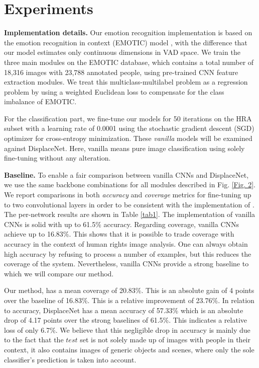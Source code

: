\documentclass[10pt,twocolumn,letterpaper]{article}
\begin{document}
\section{Experiments}

\noindent
\textbf{Implementation details.} Our emotion recognition implementation is based on the emotion recognition in context (EMOTIC) model \cite{kosti2017emotion}, with the difference that our model estimates only continuous dimensions in VAD space. We train the three main modules on the EMOTIC database, which contains a total number of 18,316 images with 23,788 annotated people, using pre-trained CNN feature extraction modules. We treat this multiclass-multilabel problem as a regression problem by using a weighted Euclidean loss to compensate for the class imbalance of EMOTIC. 

For the classification part, we fine-tune our models for 50 iterations on the HRA subset with a learning rate of 0.0001 using the stochastic gradient descent (SGD) \cite{lecun1989backpropagation} optimizer for cross-entropy minimization. These \textit{vanilla} models will be examined against DisplaceNet. Here, vanilla means pure image classification using solely fine-tuning without any alteration. 



\noindent
\textbf{Baseline.} To enable a fair comparison between vanilla CNNs and DisplaceNet, we use the same backbone combinations for all modules described in Fig. \ref{Fig. 2}. We report comparisons in both \textit{accuracy} and \textit{coverage} metrics for fine-tuning up to two convolutional layers in order to be consistent with the implementation of \cite{kalliatakis2019exploring}. The per-network results are shown in Table \ref{tab1}. The implementation of vanilla CNNs is solid with up to 61.5\% accuracy. 
Regarding coverage, vanilla CNNs achieve up to 16.83\%. This shows that it is possible to trade coverage with accuracy in the context of human rights image analysis. One can always obtain high accuracy by refusing to process a number of examples, but this reduces the coverage of the system. Nevertheless, vanilla CNNs provide a strong baseline to which we will compare our method.

Our method, has a mean coverage of 20.83\%. This is an absolute gain of 4 points over the baseline of 16.83\%. This is a relative improvement of 23.76\%. In relation to accuracy, DisplaceNet has a mean accuracy of 57.33\% which is an absolute drop of 4.17 points over the strong baselines of 61.5\%. This indicates a relative loss of only 6.7\%. We believe that this negligible drop in accuracy is mainly due to the fact that the $test$ set is not solely made up of images with people in their context, it also contains images of generic objects and scenes, where only the sole classifier's prediction is taken into account.
\end{document}
